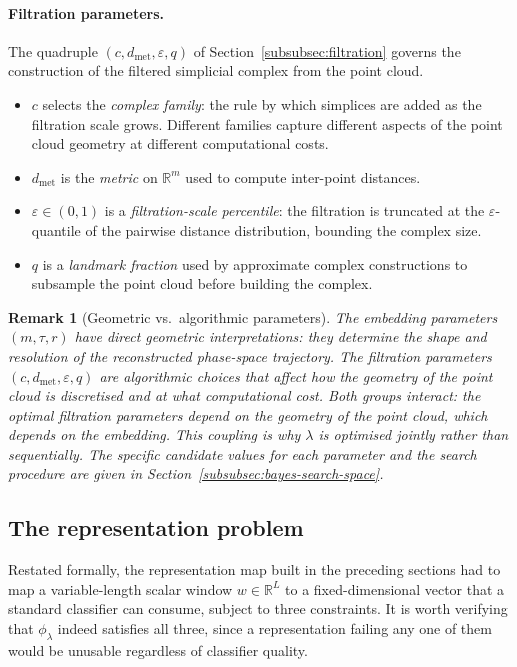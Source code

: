 \documentclass[onluarkali,ingilizce,yukseklisans,karton,LisansustuEgitim]{itutez}
\newtheorem{remark}{Remark}[chapter]
\providecommand{\R}{\mathbb{R}}
\providecommand{\1}{\mathbf{1}}
\begin{document}
\paragraph{Filtration parameters.} The quadruple $(c,d_{\mathrm{met}},\varepsilon,q)$ of Section~\ref{subsubsec:filtration} governs the construction of the filtered simplicial complex from the point cloud.
\begin{itemize}[leftmargin=1.5em]
  \item $c$ selects the \emph{complex family}: the rule by which simplices are added as the filtration scale grows. Different families capture different aspects of the point cloud geometry at different computational costs.
  \item $d_{\mathrm{met}}$ is the \emph{metric} on $\R^m$ used to compute inter-point distances.
  \item $\varepsilon\in(0,1)$ is a \emph{filtration-scale percentile}: the filtration is truncated at the $\varepsilon$-quantile of the pairwise distance distribution, bounding the complex size.
  \item $q$ is a \emph{landmark fraction} used by approximate complex constructions to subsample the point cloud before building the complex.
\end{itemize}

\begin{remark}[Geometric vs.\ algorithmic parameters]
\label{rem:param-roles}
The embedding parameters $(m,\tau,r)$ have direct geometric interpretations: they determine the shape and resolution of the reconstructed phase-space trajectory. The filtration parameters $(c,d_{\mathrm{met}},\varepsilon,q)$ are algorithmic choices that affect how the geometry of the point cloud is discretised and at what computational cost. Both groups interact: the optimal filtration parameters depend on the geometry of the point cloud, which depends on the embedding. This coupling is why $\lambda$ is optimised jointly rather than sequentially. The specific candidate values for each parameter and the search procedure are given in Section~\ref{subsubsec:bayes-search-space}.
\end{remark}

\subsection{The representation problem}
\label{subsubsec:repr-problem}

Restated formally, the representation map built in the preceding sections had to map a variable-length scalar window $w\in\R^L$ to a fixed-dimensional vector that a standard classifier can consume, subject to three constraints. It is worth verifying that $\phi_\lambda$ indeed satisfies all three, since a representation failing any one of them would be unusable regardless of classifier quality.
\end{document}
